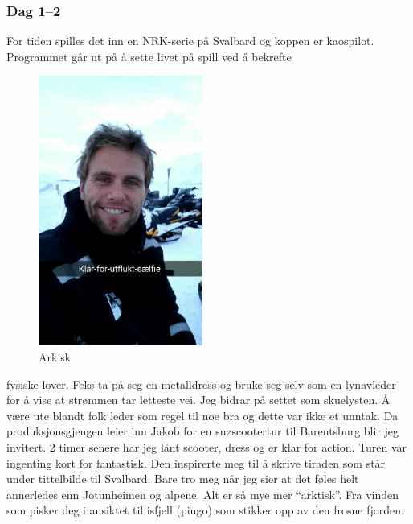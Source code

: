 \subsubsection{Dag 1--2}
For tiden spilles det inn en NRK-serie på Svalbard og koppen er
kaospilot. Programmet går ut på å sette livet på spill ved å bekrefte
\begin{figure}
	\begin{center}
	\includegraphics[width=0.48\textwidth]{klarforutsikselfie}
\end{center}
\caption*{Arkisk}
\end{figure}

fysiske lover. Feks ta på seg en metalldress og bruke seg selv som en
lynavleder for å vise at strømmen tar letteste vei. Jeg bidrar på
settet som skuelysten. Å være ute blandt folk leder som regel til noe 
bra og dette var ikke et unntak. Da produksjonsgjengen leier inn Jakob for en snøscootertur til
Barentsburg blir jeg invitert. 2 timer senere har jeg lånt scooter,
dress og er klar for action. Turen var ingenting kort for fantastisk.
Den inspirerte meg til å skrive tiraden som står under tittelbilde til
Svalbard. Bare tro meg når jeg sier at det føles helt
annerledes enn Jotunheimen og alpene. Alt er så mye mer
``arktisk''. Fra vinden som pisker deg i ansiktet til isfjell (pingo) som
stikker opp av den frosne fjorden.



